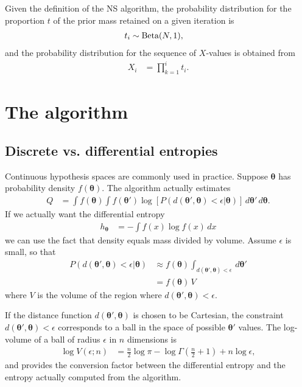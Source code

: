 \documentclass[entropy,article,submit,oneauthor,pdftex,10pt,a4paper]{mdpi}
\newcommand{\x}{\boldsymbol{\theta}}
\begin{document}
Given the definition of the NS algorithm,
the probability distribution for the proportion $t$ of the prior mass
retained on a given iteration is
\begin{align}
t_i &\sim \textnormal{Beta}(N, 1),
\end{align}
and the probability distribution for the sequence of $X$-values is
obtained from
\begin{align}
X_i &= \prod_{k=1}^i t_i.
\end{align}

\section{The algorithm}


\subsection{Discrete vs. differential entropies}

Continuous hypothesis spaces are commonly used in practice. Suppose
$\x$ has probability density $f(\x)$. The algorithm actually estimates
\begin{align}
Q &= \int f(\x) \int f(\x')
            \log \left[ P(d(\x', \x) < \epsilon | \x) \right]
                        \, d\x' \, d\x.
\end{align}
If we actually want the differential
entropy
\begin{align}
h_{\x} &= -\int f(x) \log f(x) \, dx
\end{align}
we can use the fact that density equals mass divided
by volume. Assume $\epsilon$ is small, so that
\begin{align}
P(d(\x', \x) < \epsilon | \x)
    &\approx
    f(\x) \int_{d(\x', \x) < \epsilon} \, d\x'\\
    &= f(\x) \, V
\end{align}
where $V$ is the volume of the region where $d(\x', \x) < \epsilon$.

If the distance function $d(\x', \x)$ is chosen to be Cartesian,
the constraint $d(\x', \x) < \epsilon$ corresponds to a ball in the space
of possible $\x'$ values.
The log-volume of a ball of radius $\epsilon$ in $n$ dimensions is
\begin{align}
\log V(\epsilon; n) &= \frac{n}{2}\log \pi
                        - \log \Gamma\left(\frac{n}{2} + 1\right)
                        + n \log \epsilon,
\end{align}
and provides the conversion factor between the differential entropy and
the entropy actually computed from the algorithm.
\end{document}
